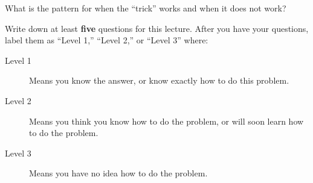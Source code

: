 \documentclass{ximera}
\begin{document}
\begin{problem}
  What is the pattern for when the ``trick'' works and when it does not work?
  \begin{freeResponse}
\end{freeResponse}
\end{problem}



\begin{xarmaBoost}
  Write down at least \textbf{five} questions for this lecture. After
  you have your questions, label them as ``Level 1,'' ``Level 2,'' or
  ``Level 3'' where:
\begin{description}
\item[Level 1] Means you know the answer, or know exactly how to do
  this problem.
\item[Level 2] Means you think you know how to do the problem, or will
  soon learn how to do the problem.
\item[Level 3] Means you have no idea how to do the problem.
\end{description}
\begin{freeResponse}
\end{freeResponse}
\end{xarmaBoost}
\end{document}
